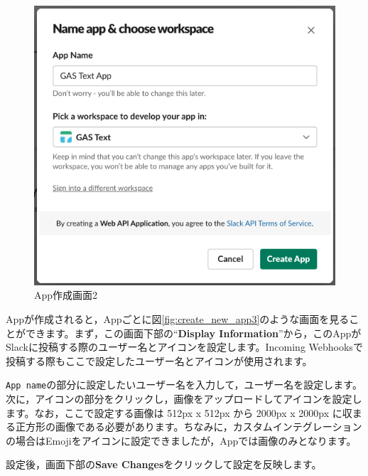 \documentclass[uplatex,a4j]{jsarticle}
\begin{document}
\begin{figure}[H]
 \centering
 \includegraphics[keepaspectratio, scale=0.55]{images/create_new_app2.png}
 \caption{App作成画面2}
 \label{fig:create_new_app2}
\end{figure}

Appが作成されると，Appごとに図\ref{fig:create_new_app3}のような画面を見ることができます。まず，この画面下部の``\textbf{Display Information}''から，このAppがSlackに投稿する際のユーザー名とアイコンを設定します。Incoming Webhooksで投稿する際もここで設定したユーザー名とアイコンが使用されます。

\verb|App name|の部分に設定したいユーザー名を入力して，ユーザー名を設定します。\\
次に，アイコンの部分をクリックし，画像をアップロードしてアイコンを設定します。なお，ここで設定する画像は 512px x 512px から 2000px x 2000px に収まる正方形の画像である必要があります。ちなみに，カスタムインテグレーションの場合はEmojiをアイコンに設定できましたが，Appでは画像のみとなります。


設定後，画面下部の\textbf{Save Changes}をクリックして設定を反映します。
\end{document}
